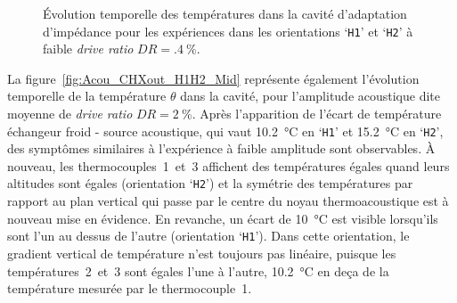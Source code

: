 
\begin{figure}[!ht]
    \centering
    
    \caption{\'Evolution temporelle des températures dans la cavité d'adaptation d'impédance pour les expériences dans les orientations `\texttt{H1}' et `\texttt{H2}' à faible \textit{drive ratio} $DR=\qty{.4}{\percent}$.}
    \label{fig:Acou_CHXout_H1H2_Low}
\end{figure}

La figure~\ref{fig:Acou_CHXout_H1H2_Mid} représente également l'évolution temporelle de la température $\theta$ dans la cavité, pour l'amplitude acoustique dite \og moyenne \fg{}  de \textit{drive ratio} $DR=\qty{2}{\percent}$. Après l'apparition de l'écart de température échangeur froid - source acoustique, qui vaut \qty{10.2}{\degreeCelsius} en `\texttt{H1}' et \qty{15.2}{\degreeCelsius} en `\texttt{H2}', des symptômes similaires à l'expérience à faible amplitude sont observables. À nouveau, les thermocouples~1~et~3 affichent des températures égales quand leurs altitudes sont égales (orientation `\texttt{H2}') et la symétrie des températures par rapport au plan vertical qui passe par le centre du noyau thermoacoustique est à nouveau mise en évidence. En revanche,  un écart de \qty{10}{\degreeCelsius} est visible lorsqu'ils sont l'un au dessus de l'autre (orientation `\texttt{H1}'). Dans cette orientation, le gradient vertical de température n'est toujours pas linéaire, puisque les températures~2~et~3 sont égales l'une à l'autre, \qty{10.2}{\degreeCelsius} en deça de la température mesurée par le thermocouple~1. 
\smallskip 

